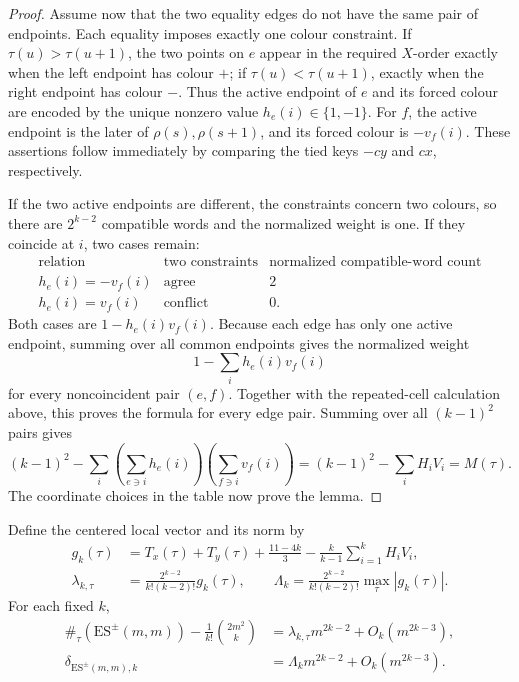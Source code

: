 \documentclass[11pt,letterpaper]{article}
\begin{document}
\begin{proof}
Assume now that the two equality edges do not have the same pair of endpoints.
Each equality imposes exactly one colour constraint.  If
$\tau(u)>\tau(u+1)$, the two points on $e$ appear in the required $X$-order
exactly when the left endpoint has colour $+$; if
$\tau(u)<\tau(u+1)$, exactly when the right endpoint has colour $-$.  Thus the
active endpoint of $e$ and its forced colour are encoded by the unique nonzero
value $h_e(i)\in\{1,-1\}$.  For $f$, the active endpoint is the later of
$\rho(s),\rho(s+1)$, and its forced colour is $-v_f(i)$.  These assertions
follow immediately by comparing the tied keys $-cy$ and $cx$, respectively.

If the two active endpoints are different, the constraints concern two
colours, so there are $2^{k-2}$ compatible words and the normalized weight is
one.  If they coincide at $i$, two cases remain:
\[
\begin{array}{c|c|c}
 \text{relation}&\text{two constraints}&
 \text{normalized compatible-word count}\\ \hline
 h_e(i)=-v_f(i)&\text{agree}&2\\
 h_e(i)= v_f(i)&\text{conflict}&0.
\end{array}
\]
Both cases are $1-h_e(i)v_f(i)$.  Because each edge has only one active
endpoint, summing over all common endpoints gives the normalized weight
\[
 1-\sum_i h_e(i)v_f(i)
\]
for every noncoincident pair $(e,f)$.  Together with the repeated-cell
calculation above, this proves the formula for every edge pair.  Summing over
all $(k-1)^2$ pairs gives
\[
 (k-1)^2-
 \sum_i\left(\sum_{e\ni i}h_e(i)\right)
       \left(\sum_{f\ni i}v_f(i)\right)
 =(k-1)^2-\sum_iH_iV_i=M(\tau).
\]
The coordinate choices in the table now prove the lemma.
\end{proof}

Define the centered local vector and its norm by
\begin{align}
 g_k(\tau)&=T_x(\tau)+T_y(\tau)+\frac{11-4k}{3}
 -\frac{k}{k-1}\sum_{i=1}^kH_iV_i,\label{eq:g-local}\\
 \lambda_{k,\tau}&=\frac{2^{k-2}}{k!(k-2)!}g_k(\tau),\qquad
 \Lambda_k=\frac{2^{k-2}}{k!(k-2)!}
       \max_\tau|g_k(\tau)|.\label{eq:lambda-local}
\end{align}
For each fixed $k$,
\begin{align}
 \#_\tau(\mathrm{ES}^{\pm}(m,m))
 -\frac1{k!}\binom{2m^2}{k}
 &=\lambda_{k,\tau}m^{2k-2}+O_k(m^{2k-3}),\label{eq:leading-pattern}\\
 \delta_{\mathrm{ES}^{\pm}(m,m),k}
 &=\Lambda_km^{2k-2}+O_k(m^{2k-3}).\label{eq:leading-delta}
\end{align}
\end{document}
